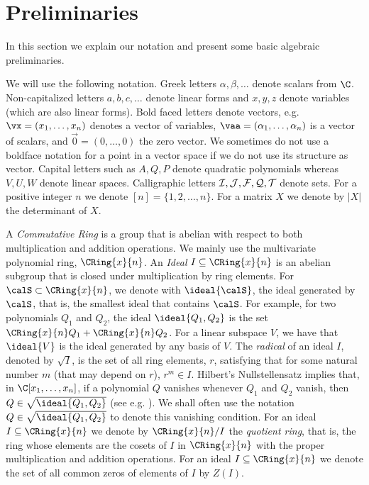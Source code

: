 \setcounter{section}{1}
\setcounter{theorem}{6}
\section{Preliminaries}\label{sec:prelim}

In this section we explain our notation and present some basic algebraic preliminaries.


We will use the following notation. Greek letters $\alpha, \beta,\ldots$ denote scalars from $\C$.  Non-capitalized letters $a,b,c,\ldots$  denote linear forms and $x,y,z$ denote variables (which are also linear forms). Bold faced letters denote vectors, e.g. $\vx=(x_1,\ldots,x_n)$ denotes a vector of variables, $\vaa=(\alpha_1,\ldots,\alpha_n)$ is a vector of scalars, and $\vec{0} = (0,\ldots,0)$ the zero vector. We sometimes do not use a boldface notation for a point in a vector space if we do not use its structure as vector. Capital letters such as $A,Q,P$  denote quadratic polynomials whereas $V,U,W$ denote linear spaces. Calligraphic letters $\cal I,J,F,Q,T$  denote sets. For a positive integer $n$ we denote $[n]=\{1,2,\ldots,n\}$. For a matrix $X$ we denote by $|X|$ the determinant of $X$.


A \emph{Commutative Ring} is a group that is abelian with respect to both multiplication and addition operations. We mainly use the multivariate polynomial ring, $\CRing{x}{n}$. An \emph{Ideal} $I\subseteq \CRing{x}{n}$ is an abelian subgroup that is closed under multiplication by ring elements. For $\calS \subset \CRing{x}{n}$, we  denote with $\ideal{\calS}$, the ideal generated by $\calS$, that is, the smallest ideal that contains $\calS$. For example, for two polynomials $Q_1$ and $Q_2$, the ideal $\ideal{Q_1,Q_2}$ is the set $\CRing{x}{n}Q_1 + \CRing{x}{n}Q_2$. For a linear subspace $V$, we have that $\ideal{V}$ is the ideal generated by any basis of $V$. The \emph{radical} of an ideal $I$, denoted by $\sqrt{I}$, is the set of all ring elements, $r$, satisfying that for some natural number $m$ (that may depend on $r$), $r^m \in I$. Hilbert's Nullstellensatz  implies that, in $\C[x_1,\ldots,x_n]$, if a polynomial $Q$ vanishes whenever $Q_1$ and $Q_2$ vanish, then $Q\in \sqrt{\ideal{Q_1,Q_2}}$ (see e.g. \cite{CLO}). We shall often use the notation $Q\in \sqrt{\ideal{Q_1,Q_2}}$ to denote this vanishing condition. For an ideal $I\subseteq \CRing{x}{n}$ we denote by $\CRing{x}{n} /I$ the \emph{quotient ring}, that is, the ring whose elements are the cosets of $I$ in $\CRing{x}{n}$ with the proper multiplication and addition operations. For an ideal $I\subseteq \CRing{x}{n}$ we denote the set of all common zeros of elements of $I$ by $Z(I)$.


